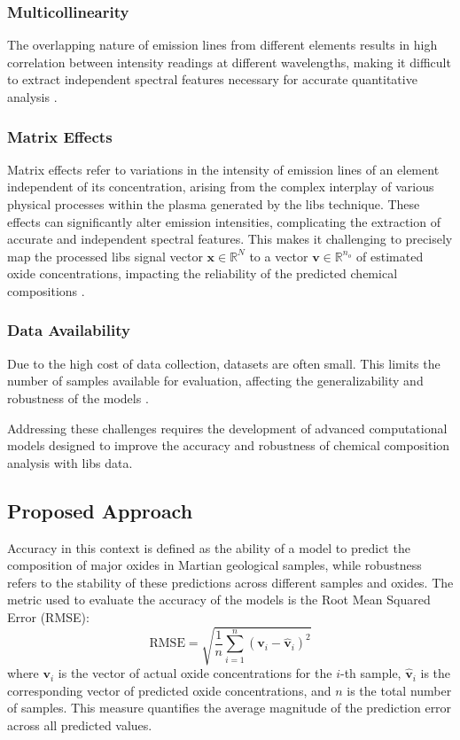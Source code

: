 \subsubsection{Multicollinearity}
The overlapping nature of emission lines from different elements results in high correlation between intensity readings at different wavelengths, making it difficult to extract independent spectral features necessary for accurate quantitative analysis \cite{andersonImprovedAccuracyQuantitative2017}.

\subsubsection{Matrix Effects}
Matrix effects refer to variations in the intensity of emission lines of an element independent of its concentration, arising from the complex interplay of various physical processes within the plasma generated by the \gls{libs} technique. These effects can significantly alter emission intensities, complicating the extraction of accurate and independent spectral features. This makes it challenging to precisely map the processed \gls{libs} signal vector $\mathbf{x} \in \mathbb{R}^N$ to a vector $\mathbf{v} \in \mathbb{R}^{n_o}$ of estimated oxide concentrations, impacting the reliability of the predicted chemical compositions \cite{cleggRecalibrationMarsScience2017, andersonImprovedAccuracyQuantitative2017}.

\subsubsection{Data Availability}
Due to the high cost of data collection, datasets are often small. This limits the number of samples available for evaluation, affecting the generalizability and robustness of the models \cite{p9_paper}.

Addressing these challenges requires the development of advanced computational models designed to improve the accuracy and robustness of chemical composition analysis with \gls{libs} data. 

\subsection{Proposed Approach}
Accuracy in this context is defined as the ability of a model to predict the composition of major oxides in Martian geological samples, while robustness refers to the stability of these predictions across different samples and oxides.
The metric used to evaluate the accuracy of the models is the Root Mean Squared Error (RMSE):
\[
\text{RMSE} = \sqrt{\frac{1}{n} \sum_{i=1}^{n} (\mathbf{v}_i - \hat{\mathbf{v}}_i)^2}
\]
where \( \mathbf{v}_i \) is the vector of actual oxide concentrations for the \( i \)-th sample, \( \hat{\mathbf{v}}_i \) is the corresponding vector of predicted oxide concentrations, and \( n \) is the total number of samples. This measure quantifies the average magnitude of the prediction error across all predicted values.

